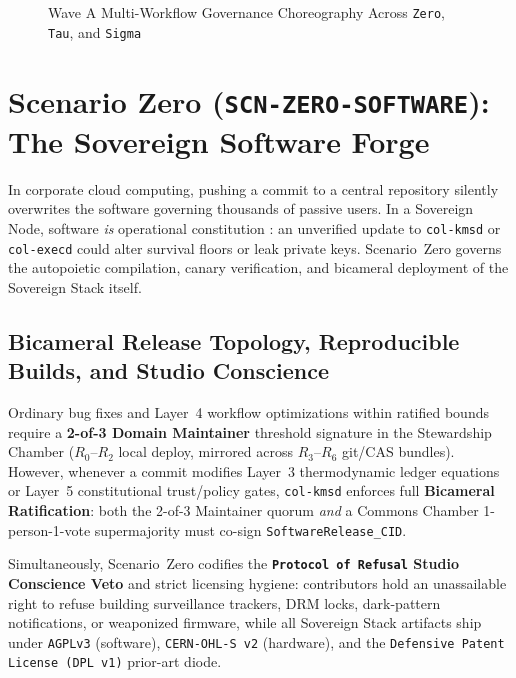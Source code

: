 \begin{figure}[htbp]
{%
}
\caption{Wave A Multi-Workflow Governance Choreography Across \texttt{Zero}, \texttt{Tau}, and \texttt{Sigma}}
\label{fig:wavea-choreography}
\end{figure}

\section{Scenario Zero (\texttt{SCN-ZERO-SOFTWARE}): The Sovereign Software Forge}
\label{sec:wavea-zero}

In corporate cloud computing, pushing a commit to a central repository silently overwrites the
software governing thousands of passive users. In a Sovereign Node, software \textit{is} operational
constitution \parencite{saltzer1984end}: an unverified update to \texttt{col-kmsd} or \texttt{col-execd}
could alter survival floors or leak private keys. Scenario~Zero governs the autopoietic compilation,
canary verification, and bicameral deployment of the Sovereign Stack itself.

\subsection{Bicameral Release Topology, Reproducible Builds, and Studio Conscience}

Ordinary bug fixes and Layer~4 workflow optimizations within ratified bounds require a \textbf{2-of-3
Domain Maintainer} threshold signature in the Stewardship Chamber ($R_0\text{--}R_2$ local deploy,
mirrored across $R_3\text{--}R_6$ git/CAS bundles). However, whenever a commit modifies Layer~3
thermodynamic ledger equations or Layer~5 constitutional trust/policy gates, \texttt{col-kmsd}
enforces full \textbf{Bicameral Ratification}: both the 2-of-3 Maintainer quorum \textit{and} a
Commons Chamber 1-person-1-vote supermajority must co-sign \texttt{SoftwareRelease\_CID}.

Simultaneously, Scenario~Zero codifies the \textbf{\texttt{Protocol of Refusal} Studio Conscience Veto}
and strict licensing hygiene: contributors hold an unassailable right to refuse building surveillance
trackers, DRM locks, dark-pattern notifications, or weaponized firmware, while all Sovereign Stack
artifacts ship under \texttt{AGPLv3} (software), \texttt{CERN-OHL-S v2} (hardware), and the
\texttt{Defensive Patent License (DPL v1)} prior-art diode.

